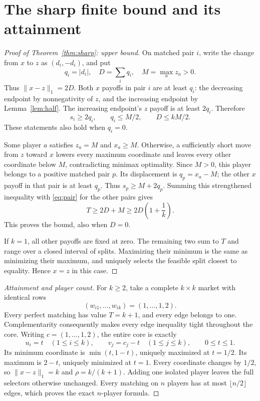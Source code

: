 \documentclass[11pt]{article}
\begin{document}
\section{The sharp finite bound and its attainment}
\begin{proof}[Proof of Theorem~\ref{thm:sharp}: upper bound]
On matched pair $i$, write the change from $x$ to $z$ as $(d_i,-d_i)$,
and put
\[
 q_i=|d_i|,\quad D=\sum_iq_i,\quad M=\max_a z_a>0.
\]
Thus $\|x-z\|_1=2D$. Both $x$ payoffs in pair $i$ are at least $q_i$:
the decreasing endpoint by nonnegativity of $z$, and the increasing
endpoint by Lemma~\ref{lem:half}. The increasing endpoint's $z$ payoff
is at least $2q_i$. Therefore
\begin{equation}\label{eq:pair}
 s_i\ge2q_i,\qquad q_i\le M/2,\qquad D\le kM/2.
\end{equation}
These statements also hold when $q_i=0$.

Some player $a$ satisfies $z_a=M$ and $x_a\ge M$. Otherwise, a
sufficiently short move from $z$ toward $x$ lowers every maximum
coordinate and leaves every other coordinate below $M$, contradicting
minimax optimality. Since $M>0$, this player belongs to a positive
matched pair $p$. Its displacement is $q_p=x_a-M$; the other $x$
payoff in that pair is at least $q_p$. Thus $s_p\ge M+2q_p$.
Summing this strengthened inequality with \eqref{eq:pair} for the other
pairs gives
\[
 T\ge2D+M\ge2D\left(1+\frac1k\right).
\]
This proves the bound, also when $D=0$.

If $k=1$, all other payoffs are fixed at zero. The remaining two sum
to $T$ and range over a closed interval of splits. Maximizing their
minimum is the same as minimizing their maximum, and uniquely selects
the feasible split closest to equality. Hence $x=z$ in this case.
\end{proof}
\begin{proof}[Attainment and player count]
For $k\ge2$, take a complete $k\times k$ market with identical rows
\[
 (w_{i1},\ldots,w_{ik})=(1,\ldots,1,2).
\]
Every perfect matching has value $T=k+1$, and every edge belongs to one.
Complementarity consequently makes every edge inequality tight throughout
the core. Writing $c=(1,\ldots,1,2)$, the entire core is exactly
\[
 u_i=t\quad(1\le i\le k),\qquad
 v_j=c_j-t\quad(1\le j\le k),\qquad0\le t\le1.
\]
Its minimum coordinate is $\min(t,1-t)$, uniquely maximized at $t=1/2$.
Its maximum is $2-t$, uniquely minimized at $t=1$. Every coordinate
changes by $1/2$, so $\|x-z\|_1=k$ and $\rho=k/(k+1)$.
Adding one isolated player leaves the full selectors otherwise unchanged.
Every matching on $n$ players has at most $\lfloor n/2\rfloor$ edges,
which proves the exact $n$-player formula.
\end{proof}
\end{document}
